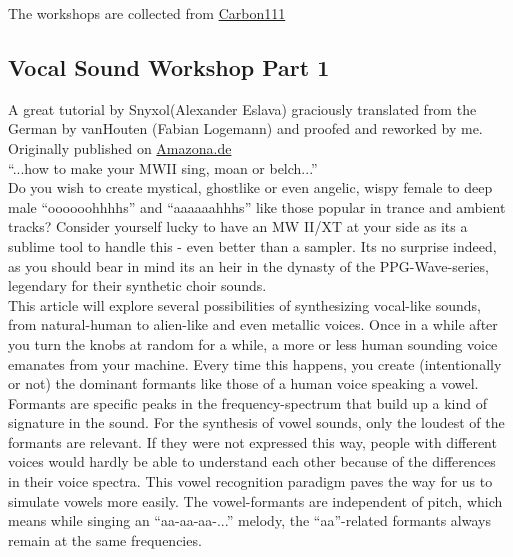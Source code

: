 The workshops are collected from \href{https://www.carbon111.com/mwxt.html}{Carbon111}
\subsection{Vocal Sound Workshop Part 1}
A great tutorial by Snyxol(Alexander Eslava) graciously translated from the German by vanHouten (Fabian Logemann) and proofed and reworked by me. Originally published on \href{https://www.amazona.de/workshop-vocal-sounds-mit-dem-waldorf-microwave/}{Amazona.de}\\
``...how to make your MWII sing, moan or belch...''\\
\bigskip
Do you wish to create mystical, ghostlike or even angelic, wispy female to deep male ``oooooohhhhs'' and ``aaaaaahhhs'' like those popular in trance and ambient tracks? Consider yourself lucky to have an MW II/XT at your side as its a sublime tool to handle this - even better than a sampler. Its no surprise indeed, as you should bear in mind its an heir in the dynasty of the PPG-Wave-series, legendary for their synthetic choir sounds.\\

This article will explore several possibilities of synthesizing vocal-like sounds, from natural-human to alien-like and even metallic voices. Once in a while after you turn the knobs at random for a while, a more or less human sounding voice emanates from your machine. Every time this happens, you create (intentionally or not) the dominant formants like those of a human voice speaking a vowel. Formants are specific peaks in the frequency-spectrum that build up a kind of signature in the sound. For the synthesis of vowel sounds, only the loudest of the formants are relevant. If they were not expressed this way, people with different voices would hardly be able to understand each other because of the differences in their voice spectra. This vowel recognition paradigm paves the way for us to simulate vowels more easily. The vowel-formants are independent of pitch, which means while singing an ``aa-aa-aa-...'' melody, the ``aa''-related formants always remain at the same frequencies.
